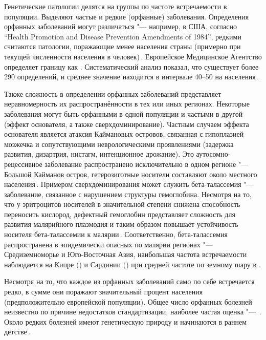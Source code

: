 \documentclass[12pt, twoside, a4paper]{article}
\newcommand{\thousands}{тыс.}
\newcommand{\mln}{млн}
\begin{document}
Генетические патологии делятся на группы по частоте встречаемости в популяции.
Выделяют частые и редкие (орфанные) заболевания.
Определения орфанных заболеваний могут различаться "--- например, в США, согласно \textenglish{``Health Promotion and Disease Prevention Amendments of 1984''}, редкими считаются патологии, поражающие менее \numprint[\thousands]{200} населения страны (примерно  при текущей численности населения в \numprint[\mln]{326} человек)\,\cite{Herder_2017}.
Европейское Медицинское Агентство определяет границу как .
Систематический анализ показал, что существует более 290 определений, и среднее значение находится в интервале 40--50 на \numprint[\thousands]{100} населения\,\cite{Richter_2015}.

Также сложность в определении орфанных заболеваний представляет неравномерность их распространённости в тех или иных регионах.
Некоторые заболевания могут быть орфанными в одной популяции и частыми в другой (эффект основателя, а также сверхдоминирование).
Частным случаем эффекта основателя является атаксия Каймановых островов, связанная с гипоплазией мозжечка и сопутствующими неврологическими проявлениями (задержка развития, дизартрия, нистагм, интенционное дрожание).
Это аутосомно-рецессивное заболевание распространено исключительно в одном регионе "--- Большой Кайманов остров, гетерозиготные носители составляют около  местного населения\,\cite{Bomar_2003}.
Примером сверхдоминирования может служить бета-талассемия "--- заболевание, связанное с нарушением структуры гемоглобина.
Несмотря на то, что у эритроцитов носителей в значительной степени снижена способность переносить кислород, дефектный гемоглобин представляет сложность для развития малярийного плазмодия и таким образом повышает устойчивость носителя бета-талассемии к малярии\,\cite{Galanello_2010}.
Соответственно, бета-талассемия распространена в эпидемически опасных по малярии регионах "--- Средиземноморье и Юго-Восточная Азия, наибольшая частота встречаемости наблюдается на Кипре () и Сардинии () при средней частоте по земному шару в .

Несмотря на то, что каждое из орфанных заболеваний само по себе встречается редко, в сумме они поражают значительный процент населения (предположительно  европейской популяции).
Общее число орфанных болезней неизвестно по причине недостатков стандартизации, наиболее частая оценка "--- \numprint[\thousands]{5--8}\,\cite{The_Lancet_Neurology_2011}.
Около  редких болезней имеют генетическую природу и начинаются в раннем детстве\,\cite{The_Lancet_Neurology_2011}.
\end{document}
